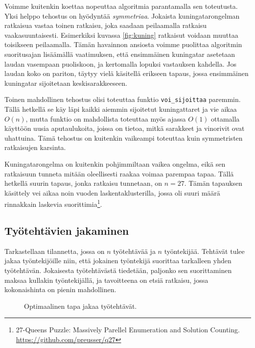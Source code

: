 Voimme kuitenkin koettaa nopeuttaa algoritmia parantamalla
sen toteutusta.
Yksi helppo tehostus on hyödyntää \emph{symmetriaa}.
Jokaista kuningatar\-ongelman ratkaisua vastaa toinen ratkaisu,
joka saadaan peilaamalla ratkaisu vaakasuuntaisesti.
Esimerkiksi kuvassa \ref{fig:kuning} ratkaisut voidaan muuttaa
toisikseen peilaamalla.
Tämän havainnon ansiosta voimme puolittaa algoritmin suoritusajan
lisäämällä vaatimuksen, että ensimmäinen kuningatar asetetaan
laudan vasempaan puoliskoon, ja kertomalla lopuksi vastauksen kahdella.
Jos laudan koko on pariton, täytyy vielä käsitellä erikseen tapaus,
jossa ensimmäinen kuningatar sijoitetaan keskisarakkeeseen.

Toinen mahdollinen tehostus olisi toteuttaa funktio
\texttt{voi\_sijoittaa} paremmin.
Tällä hetkellä se käy läpi kaikki aiemmin sijoitetut kuningattaret
ja vie aikaa $O(n)$, mutta funktio on mahdollista toteuttaa myös
ajassa $O(1)$ ottamalla käyttöön uusia aputaulukoita, joissa on tietoa,
mitkä sarakkeet ja vinorivit ovat uhattuina.
Tämä tehostus on kuitenkin vaikeampi toteuttaa kuin symmetristen ratkaisujen karsinta.

Kuningatarongelma on kuitenkin pohjimmiltaan vaikea ongelma,
eikä sen ratkaisuun tunneta mitään oleellisesti raakaa voimaa
parempaa tapaa.
Tällä hetkellä suurin tapaus, jonka ratkaisu tunnetaan, on $n=27$.
Tämän tapauksen käsittely vei aikaa noin vuoden laskentaklusterilla,
jossa oli suuri määrä rinnakkain laskevia
suorittimia\footnote{27-Queens Puzzle: Massively Parellel Enumeration and Solution Counting.
\url{https://github.com/preusser/q27}}.

\subsection{Työtehtävien jakaminen}

Tarkastellaan tilannetta, jossa on $n$ työtehtävää ja $n$ työntekijää.
Tehtävät tulee jakaa työntekijöille niin,
että jokainen työntekijä suorittaa tarkalleen yhden työtehtävän.
Jokaisesta työtehtävästä tiedetään,
paljonko sen suorittaminen maksaa kullakin työntekijällä,
ja tavoitteena on etsiä ratkaisu, jossa kokonaishinta on pienin mahdollinen.

\begin{figure}
\center
{}
\caption{Optimaalinen tapa jakaa työtehtävät.}
\label{fig:tyoteh}
\end{figure}


